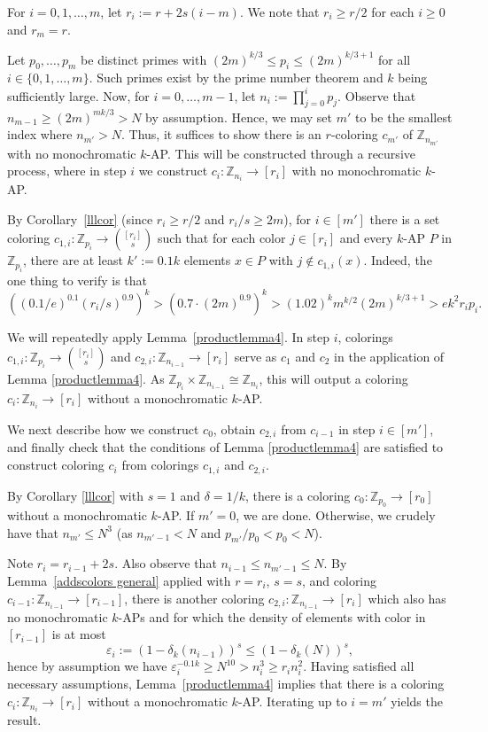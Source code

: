 \documentclass[11pt]{article}
\makeatletter
\numberwithin{equation}{section}
\renewenvironment{proof}[1][\proofname]{\par
  \vspace{-\topsep}%
  \pushQED{\qed}%
  \normalfont
  \topsep0pt \partopsep0pt %
  \trivlist
  \item[\hskip\labelsep
        \itshape
    #1\@addpunct{.}]\ignorespaces
}{%
  \popQED\endtrivlist\@endpefalse
  \addvspace{6pt plus 6pt} %
}
\theoremstyle{definition}
\theoremstyle{remark}
\makeatother
\begin{document}
\begin{proof}
    For $i=0,1,\dots,m$, let $r_i := r+2s(i-m)$. We note that $r_i\ge r/2$ for each $i\ge 0$ and $r_m=r$. 

    Let $p_0,\dots,p_m$ be distinct primes with $(2m)^{k/3}\le p_i\le (2m)^{k/3+1}$ for all $i\in \{0,1,\dots,m\}$. Such primes exist by the prime number theorem and $k$ being sufficiently large. Now, for $i=0,\dots,m-1$, let $n_i:= \prod_{j=0}^i p_j$. Observe that $n_{m-1} \geq (2m)^{mk/3}>N$ by assumption. Hence, we may set $m'$ to be the smallest index where $n_{m'}>N$. Thus, it suffices to show there is an $r$-coloring $c_{m'}$ of $\mathbb{Z}_{n_{m'}}$ with no monochromatic $k$-AP. This will be constructed through a recursive process, where in step $i$ we construct $c_i:\mathbb{Z}_{n_i}\to [r_i]$ with no monochromatic $k$-AP. 

    By Corollary~\ref{lllcor} (since $r_i\ge r/2$ and $r_i/s\ge 2m$), for $i \in [m']$ there is a set coloring $c_{1,i}:\mathbb{Z}_{p_i} \rightarrow {[r_i] \choose s}$ such that for each color $j \in [r_i]$ and every $k$-AP $P$ in $\mathbb{Z}_{p_i}$, there are at least $k':=0.1k$ elements $x\in P$ with $j\not\in c_{1,i}(x)$. Indeed, the one thing to verify is that $$((0.1/e)^{0.1}(r_i/s)^{0.9})^k>(0.7 \cdot (2m)^{0.9})^k > (1.02)^k m^{k/2} (2m)^{k/3+1} >ek^2 r_i p_i.$$ 

We will repeatedly apply Lemma~\ref{productlemma4}. In step $i$, colorings $c_{1,i}:\mathbb{Z}_{p_i} \rightarrow {[r_i] \choose s}$ and $c_{2,i}:\mathbb{Z}_{n_{i-1}} \rightarrow [r_i]$ serve as $c_1$ and $c_2$ in the application of Lemma \ref{productlemma4}. As $\mathbb{Z}_{p_i} \times \mathbb{Z}_{n_{i-1}} \cong \mathbb{Z}_{n_i}$, this will output a coloring $c_i:\mathbb{Z}_{n_i} \rightarrow [r_i]$ without a monochromatic $k$-AP.

We next describe how we construct $c_0$, obtain $c_{2,i}$ from $c_{i-1}$ in step $i \in [m']$, and finally check that the conditions of Lemma \ref{productlemma4} are satisfied to construct coloring $c_i$ from colorings $c_{1,i}$ and $c_{2,i}$.

By Corollary \ref{lllcor} with $s=1$ and $\delta=1/k$, there is a coloring $c_0:\mathbb{Z}_{p_0} \rightarrow [r_0]$ without a monochromatic $k$-AP. If $m'=0$, we are done. Otherwise, we crudely have that $n_{m'}\le N^3$ (as $n_{m'-1}<N$ and $p_{m'}/p_0<p_0<N$).

Note $r_i=r_{i-1}+2s$. Also observe that $n_{i-1}\leq n_{m'-1} \leq N$. By Lemma~\ref{addscolors general} applied with $r=r_i$, $s=s$, and coloring $c_{i-1}:\mathbb{Z}_{n_{i-1}} \rightarrow [r_{i-1}]$, there is another coloring $c_{2,i}:\mathbb{Z}_{n_{i-1}} \rightarrow [r_i]$ which also has no monochromatic $k$-APs and for which the density of elements with color in $[r_{i-1}]$ is at most \[\varepsilon_i:=(1-\delta_k(n_{i-1}))^{s} \leq (1-\delta_k(N))^{s},\] hence by assumption we have $\varepsilon_i^{-0.1k} \geq N^{10} > n_i^3 \geq r_in_i^2$. Having satisfied all necessary assumptions, Lemma~\ref{productlemma4} implies that there is a coloring $c_i:\mathbb{Z}_{n_i} \rightarrow [r_i]$ without a monochromatic $k$-AP. Iterating up to $i=m'$ yields the result.
\end{proof}
\end{document}

